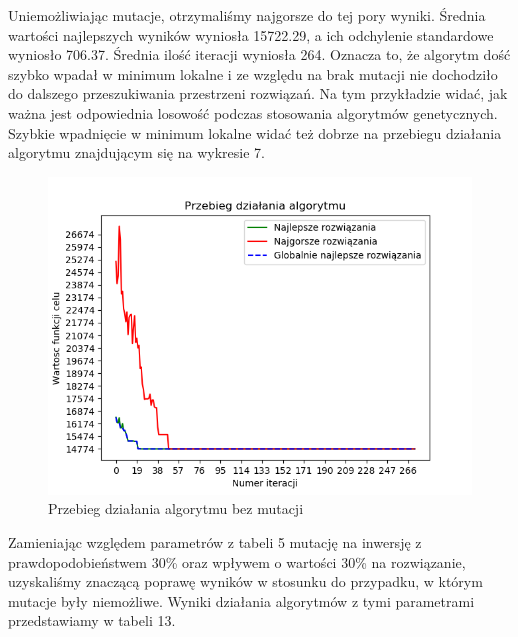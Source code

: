 \documentclass[12pt]{article}
\begin{document}
Uniemożliwiając mutacje, otrzymaliśmy najgorsze do tej pory wyniki. Średnia wartości najlepszych wyników wyniosła 15722.29, a ich odchylenie standardowe wyniosło 706.37. Średnia ilość iteracji wyniosła 264. Oznacza to, że algorytm dość szybko wpadał w minimum lokalne i ze względu na brak mutacji nie dochodziło do dalszego przeszukiwania przestrzeni rozwiązań. Na tym przykładzie widać, jak ważna jest odpowiednia losowość podczas stosowania algorytmów genetycznych. Szybkie wpadnięcie w minimum lokalne widać też dobrze na przebiegu działania algorytmu znajdującym się na wykresie 7.
\begin{figure}[H]
\caption{Przebieg działania algorytmu bez mutacji}
\includegraphics[scale=1]{no-mutation_v3.png}
\end{figure}
\par
Zamieniając względem parametrów z tabeli 5 mutację na inwersję z prawdopodobieństwem 30\% oraz wpływem o wartości 30\% na rozwiązanie, uzyskaliśmy znaczącą poprawę wyników w stosunku do przypadku, w którym mutacje były niemożliwe. Wyniki działania algorytmów z tymi parametrami przedstawiamy w tabeli 13.
\begin{table}[H]
\caption{Wyniki testów dla algorytmu z inwersją z prawdopodobieństwem 30\% i wpływem na rozwiązanie o wartości 30\%}
\begin{center}
\end{center}
\end{table}
\end{document}
